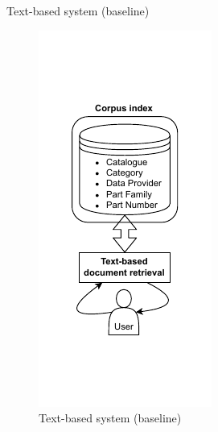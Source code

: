 \begin{frame}{Text-based system (baseline)}

    \begin{figure} [H]
        \begin{center}
            \includegraphics[scale=1]{images/tp-expe-text-based-sys.pdf} 
            \caption{Text-based system (baseline)} 
        \end{center}
    \end{figure}

\end{frame}

